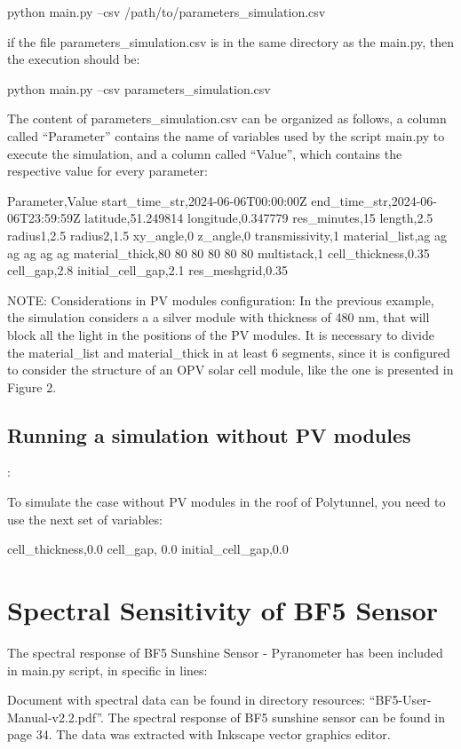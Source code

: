 \documentclass{report}
\begin{document}
python main.py –csv /path/to/parameters_simulation.csv

if the file parameters_simulation.csv is in the same directory as the main.py, then the execution should be:

python main.py –csv parameters_simulation.csv

The content of parameters_simulation.csv can be organized as follows, a column called “Parameter” contains the name of variables used by the script main.py to execute the simulation, and a column called  “Value”, which  contains the respective value for every parameter:

Parameter,Value
start_time_str,2024-06-06T00:00:00Z           
end_time_str,2024-06-06T23:59:59Z
latitude,51.249814
longitude,0.347779
res_minutes,15
length,2.5
radius1,2.5
radius2,1.5
xy_angle,0
z_angle,0
transmissivity,1
material_list,ag ag ag ag ag ag
material_thick,80 80 80 80 80 80
multistack,1
cell_thickness,0.35
cell_gap,2.8
initial_cell_gap,2.1
res_meshgrid,0.35

NOTE: Considerations in PV modules configuration:
In the previous example, the simulation considers a a silver module with thickness of 480 nm, that will block all the light in the positions of the PV modules. It is necessary to divide the material_list and material_thick in at least 6 segments, since it is configured to consider the structure of an OPV solar cell module, like the one is presented in Figure 2. 

\subsection{Running a simulation without PV modules}:

To simulate the case without PV modules in the roof of Polytunnel, you need to use the next set of variables:

cell_thickness,0.0
cell_gap, 0.0
initial_cell_gap,0.0

\section{Spectral Sensitivity of BF5 Sensor}

The spectral response of BF5 Sunshine Sensor - Pyranometer  has been included in main.py script, in specific in lines:


Document with spectral data can be found in directory resources: “BF5-User-Manual-v2.2.pdf”. The spectral response of BF5 sunshine sensor can be found in page 34. The data was extracted with 
Inkscape vector graphics editor.
\end{document}
